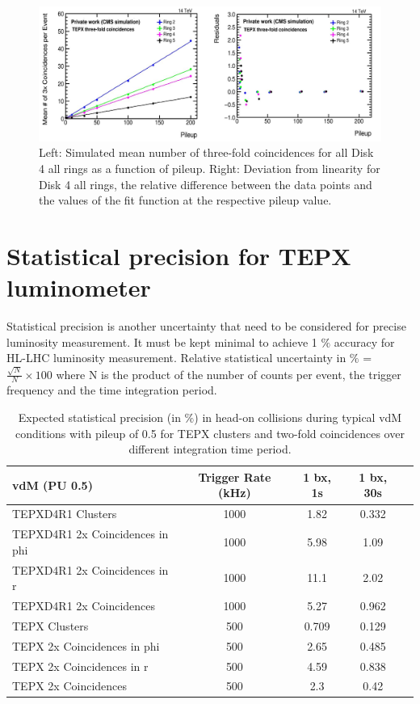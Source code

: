 \begin{figure}[H]
  \centering
  \includegraphics[width=1\columnwidth]{ashish_thesis/TEPX_threefold_linearity.png}
  \caption[Disk 4 all rings Three-Fold Coincidences Linearity]{Left: Simulated mean number of three-fold coincidences for all Disk 4 all rings as a function
    of pileup. Right: Deviation from linearity for Disk 4 all rings, the relative difference between the data points and the values of the fit function at the respective pileup value.}
  \label{fig:tepx_3foldcoin_allPU_3}
\end{figure}

\newpage
\section{Statistical precision for TEPX luminometer}

Statistical precision is another uncertainty that need to be considered for precise luminosity measurement. It must be kept minimal to achieve 1 $\%$ accuracy for HL-LHC luminosity measurement. Relative statistical uncertainty in $\%$ = $\frac{\sqrt{N}}{N} \times 100$ where N is the product of the number of counts per event, the trigger frequency and the time integration period.\\

\begin{table}[htbp]
  \centering
  \caption[Expected stat. precision of TEPX under low pileup] {Expected statistical precision (in $\%$) in head-on collisions during typical vdM conditions with pileup of 0.5 for TEPX clusters and two-fold coincidences over different integration time period.}
\begin{tabular}{lcccc}
vdM (PU 0.5) & Trigger Rate (kHz) & 1 bx, 1s & 1 bx, 30s\\
\hline
TEPXD4R1 Clusters&1000&1.82&0.332\\
TEPXD4R1 2x Coincidences in phi &1000&5.98&1.09\\
TEPXD4R1 2x Coincidences in r &1000&11.1&2.02\\
TEPXD4R1 2x Coincidences &1000&5.27&0.962\\
TEPX Clusters&500&0.709&0.129\\
TEPX 2x Coincidences in phi &500&2.65&0.485\\
TEPX 2x Coincidences in r &500&4.59&0.838\\
TEPX 2x Coincidences &500&2.3&0.42\\
\end{tabular}
\end{table}


